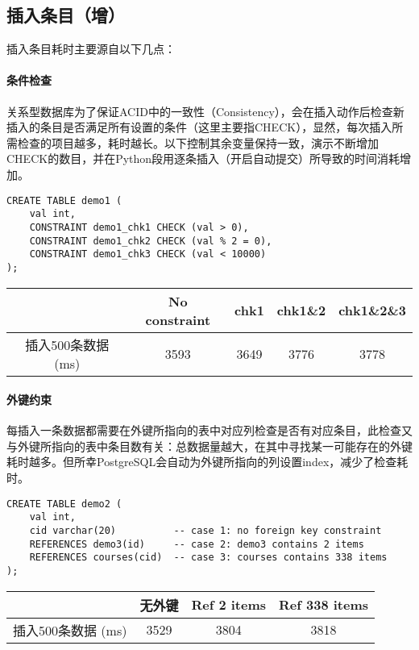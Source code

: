 \subsection{插入条目（增）}

插入条目耗时主要源自以下几点：
\vspace{-.5em}
\paragraph{条件检查} 关系型数据库为了保证ACID中的一致性（Consistency），会在插入动作后检查新插入的条目是否满足所有设置的条件（这里主要指CHECK），显然，每次插入所需检查的项目越多，耗时越长。以下控制其余变量保持一致，演示不断增加CHECK的数目，并在Python段用逐条插入（开启自动提交）所导致的时间消耗增加。
\begin{lstlisting}
CREATE TABLE demo1 (
    val int,
    CONSTRAINT demo1_chk1 CHECK (val > 0),
    CONSTRAINT demo1_chk2 CHECK (val % 2 = 0),
    CONSTRAINT demo1_chk3 CHECK (val < 10000)
);
\end{lstlisting}
\vspace{-2em}
\begin{table}[!h]
\centering
\begin{tabular}{|c|c|c|c|c|}
\hline
              & No constraint & chk1 & chk1\&2 & chk1\&2\&3 \\ \hline
插入500条数据 (ms) & 3593          & 3649 & 3776    & 3778       \\ \hline
\end{tabular}
\end{table}

\paragraph{外键约束} 每插入一条数据都需要在外键所指向的表中对应列检查是否有对应条目，此检查又与外键所指向的表中条目数有关：总数据量越大，在其中寻找某一可能存在的外键耗时越多。但所幸PostgreSQL会自动为外键所指向的列设置index，减少了检查耗时。
\begin{lstlisting}
CREATE TABLE demo2 (
    val int,
    cid varchar(20)          -- case 1: no foreign key constraint
    REFERENCES demo3(id)     -- case 2: demo3 contains 2 items
    REFERENCES courses(cid)  -- case 3: courses contains 338 items
);

\end{lstlisting}
\vspace{-2.3em}
\begin{table}[!h]
\centering
\begin{tabular}{|c|c|c|c|}
\hline
              & 无外键  & Ref 2 items & Ref 338 items \\ \hline
插入500条数据 (ms) & 3529 & 3804        & 3818          \\ \hline
\end{tabular}
\end{table}

